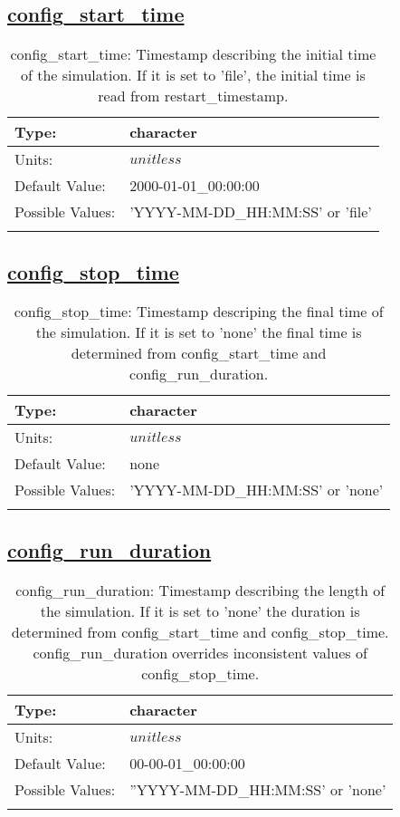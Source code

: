 \subsection[config\_start\_time]{\hyperref[sec:nm_tab_cice_model]{config\_start\_time}}
\label{subsec:nm_sec_config_start_time}
\begin{center}
\begin{longtable}{| p{2.0in} || p{4.0in} |}
    \hline
    Type: & character \\
    \hline
    Units: & $unitless$ \\
    \hline
    Default Value: & 2000-01-01\_00:00:00 \\
    \hline
    Possible Values: & 'YYYY-MM-DD\_HH:MM:SS' or 'file' \\
    \hline
    \caption{config\_start\_time: Timestamp describing the initial time of the simulation. If it is set to 'file', the initial time is read from restart\_timestamp.}
\end{longtable}
\end{center}
\subsection[config\_stop\_time]{\hyperref[sec:nm_tab_cice_model]{config\_stop\_time}}
\label{subsec:nm_sec_config_stop_time}
\begin{center}
\begin{longtable}{| p{2.0in} || p{4.0in} |}
    \hline
    Type: & character \\
    \hline
    Units: & $unitless$ \\
    \hline
    Default Value: & none \\
    \hline
    Possible Values: & 'YYYY-MM-DD\_HH:MM:SS' or 'none' \\
    \hline
    \caption{config\_stop\_time: Timestamp descriping the final time of the simulation. If it is set to 'none' the final time is determined from config\_start\_time and config\_run\_duration.}
\end{longtable}
\end{center}
\subsection[config\_run\_duration]{\hyperref[sec:nm_tab_cice_model]{config\_run\_duration}}
\label{subsec:nm_sec_config_run_duration}
\begin{center}
\begin{longtable}{| p{2.0in} || p{4.0in} |}
    \hline
    Type: & character \\
    \hline
    Units: & $unitless$ \\
    \hline
    Default Value: & 00-00-01\_00:00:00 \\
    \hline
    Possible Values: & ''YYYY-MM-DD\_HH:MM:SS' or 'none' \\
    \hline
    \caption{config\_run\_duration: Timestamp describing the length of the simulation. If it is set to 'none' the duration is determined from config\_start\_time and config\_stop\_time. config\_run\_duration overrides inconsistent values of config\_stop\_time.}
\end{longtable}
\end{center}
